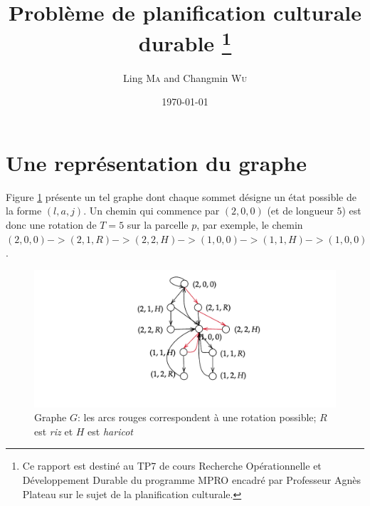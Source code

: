 \documentclass[a4paper]{article}
\title{Problème de planification culturale durable \footnote{Ce rapport est destiné au TP7 de cours Recherche Opérationnelle et Développement Durable du programme MPRO encadré par Professeur Agnès Plateau sur le sujet de la planification culturale.}}
\author{Ling \textsc{Ma} and Changmin \textsc{Wu}}
\date{\today}
\begin{document}
\maketitle
\tableofcontents

\section{Une représentation du graphe}
Figure \ref{fig:diam} présente un tel graphe dont chaque sommet désigne un état possible de la forme $(l,a,j)$. Un chemin qui commence par $(2,0,0)$ (et de longueur $5$) est donc une rotation de $T=5$ sur la parcelle $p$, par exemple, le chemin $(2,0,0)->(2,1,R)->(2,2,H)->(1,0,0)->(1,1,H)->(1,0,0)$. 
\begin{figure}[h!t]
    \centering
    \includegraphics[width=\textwidth]{diagram.pdf}
    \caption{Graphe $G$: les arcs rouges correspondent à une rotation possible; $R$ est \textit{riz} et $H$ est \textit{haricot}}
    \label{fig:diam}
\end{figure}
\end{document}
